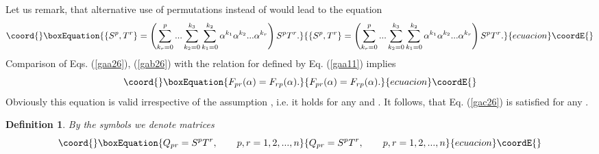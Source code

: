 \documentclass[a4paper,a4paper]{article}
\newtheorem{definition}[theorem]{Definition}
\begin{document}
Let us remark, that alternative use of permutations \coordHE{} instead of \coordHE{} would lead to the equation 
\begin{equation}\coord{}\boxEquation{
\{S^{p},T^{r}\}=\left(
\sum_{k_{r}=0}^{p}...\sum_{k_{2}=0}^{k_{3}}\sum_{k_{1}=0}^{k_{2}}\alpha
^{k_{1}}\alpha ^{k_{2}}...\alpha ^{k_{r}}\right) S^{p}T^{r}.  \label{gab26}
}{
\{S^{p},T^{r}\}=\left(
\sum_{k_{r}=0}^{p}...\sum_{k_{2}=0}^{k_{3}}\sum_{k_{1}=0}^{k_{2}}\alpha
^{k_{1}}\alpha ^{k_{2}}...\alpha ^{k_{r}}\right) S^{p}T^{r}.  }{ecuacion}\coordE{}\end{equation}%
Comparison of Eqs. (\ref{gaa26}), (\ref{gab26}) with the relation for \coordHE{} defined by Eq. (\ref{gaa11}) implies 
\begin{equation}\coord{}\boxEquation{
F_{pr}(\alpha )=F_{rp}(\alpha ).  \label{gac26}
}{
F_{pr}(\alpha )=F_{rp}(\alpha ).  }{ecuacion}\coordE{}\end{equation}%
Obviously this equation is valid irrespective of the assumption \coordHE{}, i.e. it holds for any \coordHE{} and \coordHE{}. It
follows, that Eq. (\ref{gac26}) is satisfied for any \myHighlight{$\alpha $}\coordHE{}.

\begin{definition}
\label{def9}By the symbols \coordHE{} we denote \coordHE{} matrices 
\begin{equation}\coord{}\boxEquation{
Q_{pr}=S^{p}T^{r},\qquad p,r=1,2,...,n  \label{ga27}
}{
Q_{pr}=S^{p}T^{r},\qquad p,r=1,2,...,n  }{ecuacion}\coordE{}\end{equation}
\end{definition}
\end{document}
